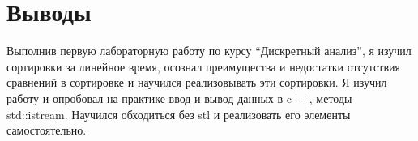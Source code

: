 \section{Выводы}
Выполнив первую лабораторную работу по курсу \enquote{Дискретный анализ}, я изучил сортировки за линейное время, осознал преимущества и недостатки отсутствия сравнений в сортировке и научился реализовывать эти сортировки. Я изучил работу и опробовал на практике ввод и вывод данных в c++, методы std::istream. Научился обходиться без stl и реализовать его элементы самостоятельно.\pagebreak